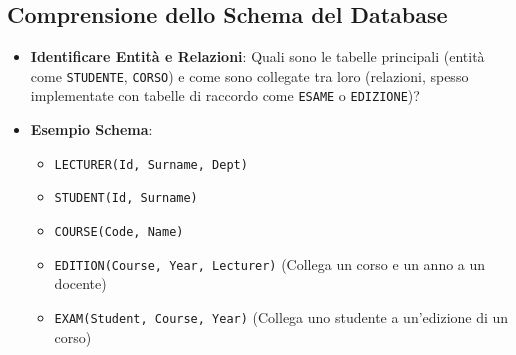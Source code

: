 \subsection{Comprensione dello Schema del Database}
\begin{itemize}
    \item \textbf{Identificare Entità e Relazioni}: Quali sono le tabelle principali (entità come \texttt{STUDENTE}, \texttt{CORSO}) e come sono collegate tra loro (relazioni, spesso implementate con tabelle di raccordo come \texttt{ESAME} o \texttt{EDIZIONE})?
    \item \textbf{Esempio Schema}:
    \begin{itemize}
        \item \texttt{LECTURER(Id, Surname, Dept)}
        \item \texttt{STUDENT(Id, Surname)}
        \item \texttt{COURSE(Code, Name)}
        \item \texttt{EDITION(Course, Year, Lecturer)} (Collega un corso e un anno a un docente)
        \item \texttt{EXAM(Student, Course, Year)} (Collega uno studente a un'edizione di un corso)
    \end{itemize}
\end{itemize}


